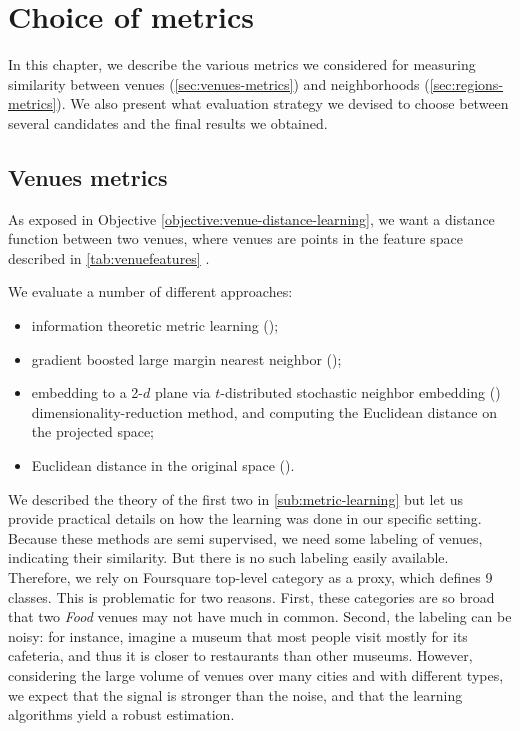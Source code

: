 \chapter{Choice of metrics}
\label{chap:metric}
\iffalse
In this chapter, we describe the various metrics we considered for measuring
similarity between venues (\autoref{sec:venues-metrics}) and neighborhoods
(\autoref{sec:regions-metrics}). We also present what evaluation strategy we
devised to choose between several candidates and the final results we obtained.

\section{Venues metrics}
\label{sec:venues-metrics}

As exposed in Objective \ref{objective:venue-distance-learning}, we want a
distance function between two venues, where venues are points in the feature
space described in \autoref{tab:venuefeatures} .

We evaluate a number of different approaches:
\begin{itemize}
	\item
		information theoretic metric learning (\itml);
	\item
		gradient boosted large margin nearest neighbor (\lmnn);
	\item
		embedding to a 2-$d$ plane via $t$-distributed stochastic neighbor
		embedding (\tsne) dimensionality-reduction method, and computing the
		Euclidean distance on the projected space; 
	\item 
		Euclidean distance in the original space (\eucl).
\end{itemize}		

We described the theory of the first two in \autoref{sub:metric-learning} but
let us provide practical details on how the learning was done in our specific
setting. Because these methods are semi supervised, we need some labeling of
venues, indicating their similarity. But there is no such labeling easily
available. Therefore, we rely on Foursquare top-level category as a proxy,
which defines 9 classes. This is problematic for two reasons. First, these
categories are so broad that two \emph{Food} venues may not have much in
common. Second, the labeling can be noisy: for instance, imagine a museum that
most people visit mostly for its cafeteria, and thus it is closer to
restaurants than other museums.  However, considering the large volume of
venues over many cities and with different types, we expect that the signal is
stronger than the noise, and that the learning algorithms yield a robust
estimation. 

